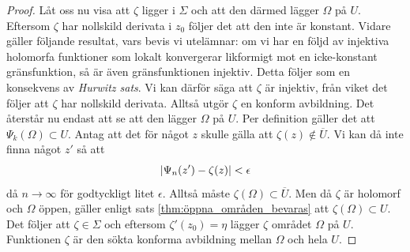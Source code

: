 \begin{proof}
	Låt oss nu visa att $\zeta$ ligger i $\Sigma$ och att den därmed lägger $\Omega$ på $U$. Eftersom $\zeta$ har nollskild derivata i $z_0$ följer det att den inte är konstant. Vidare gäller följande resultat, vars bevis vi utelämnar: om vi har en följd av injektiva holomorfa funktioner som lokalt konvergerar likformigt mot en icke-konstant gränsfunktion, så är även gränsfunktionen injektiv. Detta följer som en konsekvens av \emph{Hurwitz sats}. Vi kan därför säga att $\zeta$ är injektiv, från viket det följer att $\zeta$ har nollskild derivata. Alltså utgör $\zeta$ en konform avbildning. Det återstår nu endast att se att den lägger $\Omega$ på $U$. Per definition gäller det att $\Psi_k(\Omega) \subset U$. Antag att det för något $z$ skulle gälla att $\zeta(z) \notin \overline{U}$. Vi kan då inte finna något $z'$ så att
	\begin{equation*}
		\left\lvert \Psi_n(z') - \zeta(z) \right\rvert < \epsilon
	\end{equation*}
	då $n \to \infty$ för godtyckligt litet $\epsilon$. Alltså måste $\zeta(\Omega) \subset \overline{U}$. Men då $\zeta$ är holomorf och $\Omega$ öppen, gäller enligt sats \ref{thm:öppna_områden_bevaras} att $\zeta(\Omega) \subset U$. Det följer att $\zeta \in \Sigma$ och eftersom $\zeta'(z_0) = \eta$ lägger $\zeta$ området $\Omega$ på $U$. Funktionen $\zeta$ är den sökta konforma avbildning mellan $\Omega$ och hela $U$.
\end{proof}

